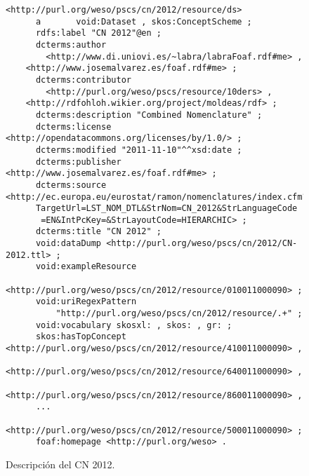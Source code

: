 \begin{figure}[!htp]
\begin{lstlisting} 
<http://purl.org/weso/pscs/cn/2012/resource/ds>
      a       void:Dataset , skos:ConceptScheme ;
      rdfs:label "CN 2012"@en ;
      dcterms:author 
        <http://www.di.uniovi.es/~labra/labraFoaf.rdf#me> , 
	<http://www.josemalvarez.es/foaf.rdf#me> ;
      dcterms:contributor
        <http://purl.org/weso/pscs/resource/10ders> ,
	<http://rdfohloh.wikier.org/project/moldeas/rdf> ; 
      dcterms:description "Combined Nomenclature" ;
      dcterms:license <http://opendatacommons.org/licenses/by/1.0/> ;
      dcterms:modified "2011-11-10"^^xsd:date ;
      dcterms:publisher <http://www.josemalvarez.es/foaf.rdf#me> ;
      dcterms:source <http://ec.europa.eu/eurostat/ramon/nomenclatures/index.cfm?
	  TargetUrl=LST_NOM_DTL&StrNom=CN_2012&StrLanguageCode
	   =EN&IntPcKey=&StrLayoutCode=HIERARCHIC> ;
      dcterms:title "CN 2012" ;
      void:dataDump <http://purl.org/weso/pscs/cn/2012/CN-2012.ttl> ;
      void:exampleResource
         <http://purl.org/weso/pscs/cn/2012/resource/010011000090> ;
      void:uriRegexPattern
          "http://purl.org/weso/pscs/cn/2012/resource/.+" ;
      void:vocabulary skosxl: , skos: , gr: ;
      skos:hasTopConcept <http://purl.org/weso/pscs/cn/2012/resource/410011000090> , 
	 <http://purl.org/weso/pscs/cn/2012/resource/640011000090> , 
	 <http://purl.org/weso/pscs/cn/2012/resource/860011000090> , 
	  ...
	 <http://purl.org/weso/pscs/cn/2012/resource/500011000090> ;
      foaf:homepage <http://purl.org/weso> .
\end{lstlisting}
	\caption{Descripción del \dataset CN 2012.}
	\label{fig:pscs-ds-cn-2012}
\end{figure}



